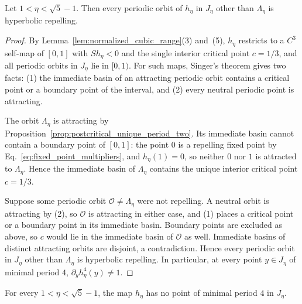 \documentclass{article}
\begin{document}
\begin{lemma}
\label{lem:unique_nonrepelling_cycle}
Let $1<\eta<\sqrt5-1$. Then every periodic orbit of $h_\eta$ in $J_\eta$ other
than $\Lambda_\eta$ is hyperbolic repelling.
\end{lemma}

\begin{proof}
By Lemma~\ref{lem:normalized_cubic_range}(3) and~(5), $h_\eta$ restricts to a
$C^3$ self-map of $[0,1]$ with $Sh_\eta<0$ and the single interior critical
point $c=1/3$, and all periodic orbits in $J_\eta$ lie in $[0,1)$. For such
maps, Singer's theorem \citep[Theorem II.6.1]{demelo1993onedimensional} gives
two facts: (1) the
immediate basin of an attracting periodic orbit contains a critical point or a
boundary point of the interval, and (2) every neutral periodic point is attracting.

The orbit $\Lambda_\eta$ is attracting by
Proposition~\ref{prop:postcritical_unique_period_two}. Its immediate basin
cannot contain a boundary point of $[0,1]$: the point $0$ is a repelling fixed
point by Eq.~\eqref{eq:fixed_point_multipliers}, and $h_\eta(1)=0$, so neither
$0$ nor $1$ is attracted to $\Lambda_\eta$. Hence the immediate basin of
$\Lambda_\eta$ contains the unique interior critical point $c=1/3$.

Suppose some periodic orbit $\mathcal O\ne\Lambda_\eta$ were not repelling. A
neutral orbit is attracting by (2), so $\mathcal O$ is attracting in either
case, and (1) places a critical point or a boundary point in its immediate
basin. Boundary points are excluded as above, so $c$ would lie in
the immediate basin of $\mathcal O$ as well. Immediate basins of distinct
attracting orbits are disjoint, a contradiction. Hence every periodic orbit in
$J_\eta$ other than $\Lambda_\eta$ is hyperbolic repelling. In particular, at
every point $y\in J_\eta$ of minimal period $4$,
$\partial_y h_\eta^4(y)\ne 1$.
\end{proof}

\begin{proposition}
\label{prop:no_period_four}
For every $1<\eta<\sqrt5-1$, the map $h_\eta$ has no point of minimal period $4$
in $J_\eta$.
\end{proposition}
\end{document}
